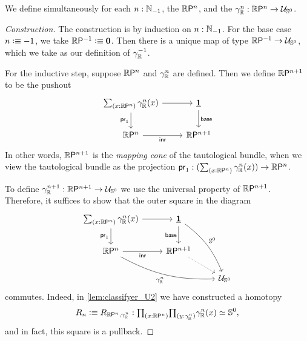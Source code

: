 \begin{defn}\label{defn:realprojective}
We define simultaneously for each $n:\N_{-1}$, 
the  $\rprojective{n}$, 
and the  $\tautfam[\R]{n}:\rprojective{n}\to \UU_{\sphere{0}}$.
\end{defn}

\begin{proof}[Construction]
The construction is by induction on $n:\N_{-1}$.
For the base case $n\defeq -1$, 
we take $\rprojective{-1}\defeq\emptyt$. 
Then there is a unique map of type $\rprojective{-1}\to \UU_{\sphere{0}}$, which we
take as our definition of $\tautfam[\R]{-1}$.

For the inductive step, suppose $\rprojective{n}$ and $\tautfam[\R]{n}$ are defined. Then we define $\rprojective{n+1}$ to be the pushout
\begin{equation*}
\begin{tikzcd}
{\sm{x:\rprojective{n}}\tautfam[\R]{n}(x)} \arrow[d,swap,"\proj 1"] \arrow[r] & \unit \arrow[d,"\base"] \\
\rprojective{n} \arrow[r,swap,"\inr"] & \rprojective{n+1}
\end{tikzcd}
\end{equation*}
In other words, 
$\rprojective{n+1}$ is the \emph{mapping cone} of the tautological bundle, 
when we view the tautological bundle as the projection 
$\proj 1:(\sm{x:\rprojective{n}}\tautfam[\R]{n}(x))\to\rprojective{n}$. 

To define $\tautfam[\R]{n+1}:\rprojective{n+1}\to \UU_{\sphere{0}}$
we use the universal property of $\rprojective{n+1}$. 
Therefore, it suffices to show that the outer square in the diagram
\begin{equation}\label{eq:diagram}
\begin{tikzcd}
{\sm{x:\rprojective{n}}\tautfam[\R]{n}(x)} \arrow[d,swap,"\proj 1"] \arrow[r] & \unit \arrow[d,swap,"\base"] \arrow[ddr,bend left=15,"\sphere{0}"]\\
\rprojective{n} \arrow[drr,bend right=15,swap,"{\tautfam[\R]{n}}"] \arrow[r,swap,"\inr"] & \rprojective{n+1} \arrow[dr,densely dotted] \\
& & \UU_{\sphere{0}}
\end{tikzcd}
\end{equation}
commutes. Indeed, in \cref{lem:classifyer_U2} we have constructed a homotopy 
\begin{equation*}
R_n\defeq R_{\rprojective{n},\tautfam[\R]{n}}:\prd{x:\rprojective{n}}{y:\tautfam[\R]{n}} \eqv{\tautfam[\R]{n}(x)}{\sphere{0}},
\end{equation*}
and in fact, this square is a pullback.
\end{proof}

